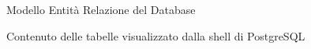 \begin{figure}[ht]
	\centering
	\caption{Modello Entità Relazione del Database}
	\label{fig:one}
\end{figure}

\begin{figure}[ht]
	\centering
	\caption{Contenuto delle tabelle visualizzato dalla shell di PostgreSQL}
	\label{fig:one}
\end{figure}
\newpage
